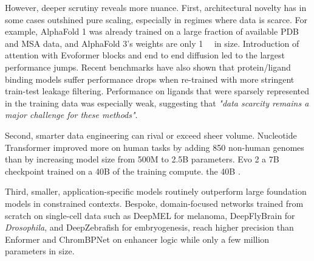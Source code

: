 However, deeper scrutiny reveals more nuance. First, architectural novelty has in some cases outshined pure scaling, especially in regimes where data is scarce. For example, AlphaFold 1 was already trained on a large fraction of available PDB and MSA data, and AlphaFold 3's weights are only \mbox{\SI{1}{\giga\byte}} in size. Introduction of attention with Evoformer blocks and end to end diffusion led to the largest performance jumps. Recent benchmarks have also shown that protein/ligand binding models suffer performance drops when re-trained with more stringent train-test leakage filtering. Performance on ligands that were sparsely represented in the training data was especially weak, suggesting that \textit{"data scarcity remains a major challenge for these methods"}.

Second, smarter data engineering can rival or exceed sheer volume. Nucleotide Transformer improved more on human tasks by adding 850 non-human genomes than by increasing model size from 500M to 2.5B parameters. Evo 2 a 7B checkpoint trained on a 40B of the training compute. the 40B .

Third, smaller, application-specific models routinely outperform large foundation models in constrained contexts. Bespoke, domain-focused networks trained from scratch on single-cell data such as DeepMEL for melanoma, DeepFlyBrain for \textit{Drosophila}, and DeepZebrafish for embryogenesis, reach higher precision than Enformer and ChromBPNet on enhancer logic while only a few million parameters in size.

